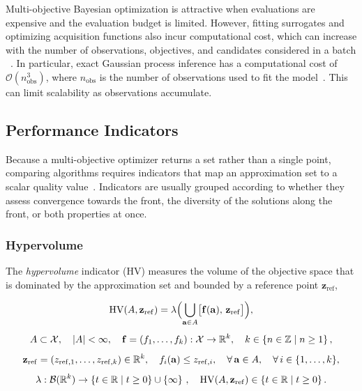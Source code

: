 Multi-objective Bayesian optimization is attractive when evaluations
are expensive and the evaluation budget is limited. However, fitting
surrogates and optimizing acquisition functions also incur computational
cost, which can increase with the number of observations, objectives,
and candidates considered in a batch
~\cite{Daulton2021qNEHVI,Ament2023Unexpected}. In particular, exact
Gaussian process inference has a
computational cost of $\mathcal{O}(n_{\mathrm{obs}}^3)$, where
$n_{\mathrm{obs}}$ is the number of observations used to fit the
model~\cite{daulton2022multi}. This can limit scalability as
observations accumulate.

\subsection{Performance Indicators}
\label{subsubsec:performance_indicators}

Because a multi-objective optimizer returns a set rather than a single point, comparing algorithms requires indicators that map an approximation set
to a scalar quality value~\cite{Guerreiro2020}. Indicators are usually grouped according to whether they assess convergence towards the front, the
diversity of the solutions along the front, or both properties at once.

\subsubsection{Hypervolume}
The \emph{hypervolume} indicator (HV) measures the volume of the objective space that is dominated by the approximation set and bounded by a reference
point $\mathbf{z}_{\mathrm{ref}}$,

\begin{equation}
    \label{eq:hv}
    \begin{gathered}
        \mathrm{HV}(A, \mathbf{z}_{\mathrm{ref}}) =
        \lambda \Bigl(
            \bigcup_{\mathbf{a} \in A}
            \bigl[\mathbf{f}(\mathbf{a}),\, \mathbf{z}_{\mathrm{ref}}\bigr]
        \Bigr),
        \\[4pt]
        A \subset \mathcal{X},
        \quad
        |A| < \infty,
        \quad
        \mathbf{f} = (f_1,\ldots,f_k) : \mathcal{X} \rightarrow \mathbb{R}^{k},
        \quad
        k \in \left\{ n \in \mathbb{Z} \mid n \ge 1 \right\},
        \\[4pt]
        \mathbf{z}_{\mathrm{ref}} = (z_{\mathrm{ref},1},\ldots,z_{\mathrm{ref},k}) \in \mathbb{R}^{k},
        \quad
        f_i(\mathbf{a}) \leq z_{\mathrm{ref},i},
        \quad
        \forall\, \mathbf{a} \in A,
        \quad
        \forall\, i \in \{1,\ldots,k\},
        \\[4pt]
        \lambda : \mathcal{B}(\mathbb{R}^{k}) \rightarrow \left\{ t \in \mathbb{R} \mid t \ge 0 \right\} \cup \{\infty\}
        \ ,
        \quad
        \mathrm{HV}(A, \mathbf{z}_{\mathrm{ref}}) \in \left\{ t \in \mathbb{R} \mid t \ge 0 \right\}.
    \end{gathered}
\end{equation}

